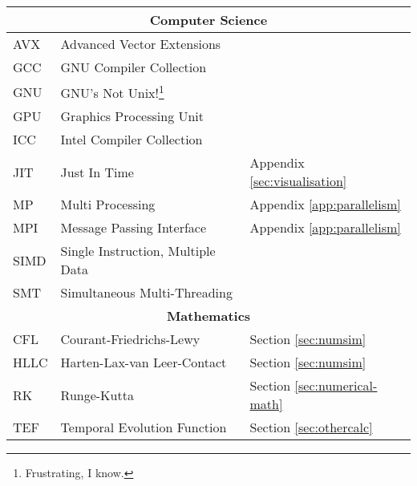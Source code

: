 \begin{abbreviations}
\begin{longtable}[c]{lll}
  \hline
  \multicolumn{3}{c}{\textbf{Computer Science}} \\
  \hline

  AVX  & Advanced Vector Extensions & \\
  GCC  & GNU Compiler Collection & \\
  GNU  & GNU's Not Unix!\footnote{Frustrating, I know.} & \\
  GPU  & Graphics Processing Unit & \\
  ICC  & Intel Compiler Collection & \\
  JIT  & Just In Time & Appendix \ref{sec:visualisation} \\
  MP   & Multi Processing & Appendix \ref{app:parallelism} \\
  MPI  & Message Passing Interface & Appendix \ref{app:parallelism} \\
  SIMD & Single Instruction, Multiple Data & \\
  SMT  & Simultaneous Multi-Threading & \\

  \hline
  \multicolumn{3}{c}{\textbf{Mathematics}} \\
  \hline

  CFL  & Courant-Friedrichs-Lewy & Section \ref{sec:numsim} \\
  HLLC & Harten-Lax-van Leer-Contact & Section \ref{sec:numsim} \\
  RK   & Runge-Kutta & Section \ref{sec:numerical-math} \\
  TEF & Temporal Evolution Function & Section \ref{sec:othercalc} \\

\end{longtable}
\end{abbreviations}

